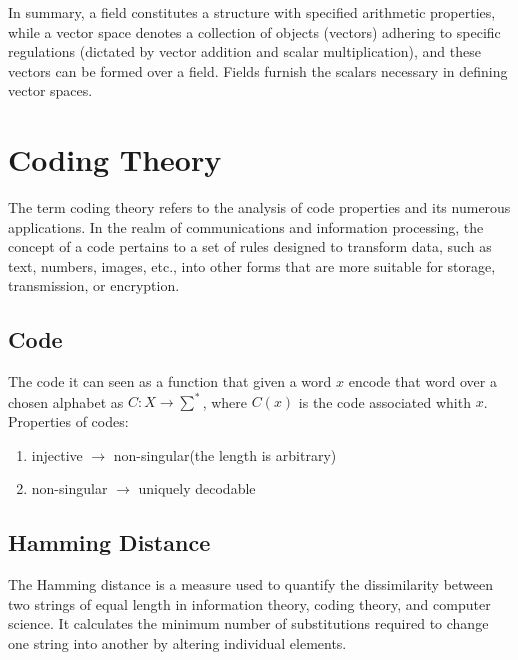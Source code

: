 In summary, a field constitutes a structure with specified arithmetic properties, while a vector space denotes a collection of objects (vectors) adhering to specific regulations (dictated by vector addition and scalar multiplication), and these vectors can be formed over a field. Fields furnish the scalars necessary in defining vector spaces.

\section{Coding Theory}
The term coding theory refers to the analysis of code properties and its 
numerous applications. In the realm of communications and information 
processing, the concept of a code pertains to a set of rules designed to 
transform data, such as text, numbers, images, etc., into other forms that are 
more suitable for storage, transmission, or encryption. %
\subsection{Code}
The code it can seen as a function  that given a word $x$ encode that word over 
a chosen alphabet as $C: X \rightarrow \sum ^*$, where $C(x)$ is the code 
associated whith $x$. Properties of codes:
\begin{enumerate}
 \item injective $\rightarrow$ non-singular(the length is arbitrary)
 \item non-singular $\rightarrow$ uniquely decodable
\end{enumerate}

\subsection{Hamming Distance}
The Hamming distance is a measure used to quantify the dissimilarity between 
two strings of equal length in information theory, coding theory, and 
computer science. It calculates the minimum number of substitutions 
required to change one string into another by altering individual elements.

